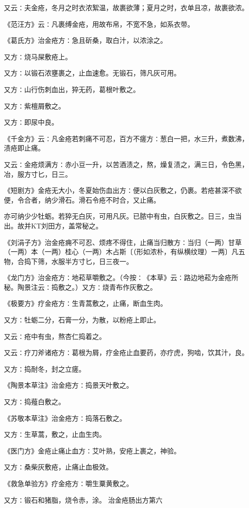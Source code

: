 \documentclass[a4paper,12pt,UTF8,twoside]{ctexbook}
\begin{document}
又云∶夫金疮，冬月之时衣浓絮温，故裹欲薄；夏月之时，衣单且凉，故裹欲浓。

《范汪方》云∶凡裹缚金疮，用故布帛，不宽不急，如系衣带。

《葛氏方》治金疮方∶急且斫桑，取白汁，以浓涂之。

又方∶烧马屎敷疮上。

又方∶以锻石浓壅裹之，止血速愈。无锻石，筛凡灰可用。

又方∶山行伤刺血出，猝无药，葛根叶敷之。

又方∶紫檀屑敷之。

又方∶即尿中良。

《千金方》云∶凡金疮若刺痛不可忍，百方不瘥方∶葱白一把，水三升，煮数沸，渍疮即止痛。

又云∶金疮烦满方∶赤小豆一升，以苦酒渍之，熬，燥复渍之，满三日，令色黑，冶，服方寸匕，日三。

《短剧方》金疮无大小，冬夏始伤血出方∶便以白灰敷之，仍裹。若疮甚深不欲便，令合者，纳少滑石。滑石令疮不时合，又止痛。

亦可纳少少牡蛎。若猝无白灰，可用凡灰。已脓中有虫，白灰敷之。日三，虫当出。故并KT刘田方，盖常秘之。

《刘涓子方》治金疮痈不可忍、烦疼不得住，止痛当归散方∶当归（一两）甘草（一两）本（一两）桂心（一两）木占斯〔（形如浓朴，有纵横纹理）一两〕凡五物，合捣下筛，水服半方寸匕，日三夜一。

《龙门方》治金疮方∶地菘草嚼敷之。（今按∶《本草》云∶路边地菘为金疮所秘。陶景注云∶捣敷之。）又方∶烧青布作灰敷之。

《极要方》疗金疮方∶生青蒿敷之，止痛，断血生肉。

又方∶牡蛎二分，石膏一分，为散，以粉疮上即止。

又云∶疮中有虫，熬杏仁捣着之。

又云∶疗刀斧诸疮方∶葛根为屑，疗金疮止血要药，亦疗虎，狗啮，饮其汁，良。

又方∶捣耐冬，封之立瘥。

《陶景本草注》治金疮方∶捣景天叶敷之。

又方∶捣薤白敷之。

《苏敬本草注》治金疮方∶捣落石敷之。

又方∶生草蒿，敷之，止血生肉。

《医门方》金疮止痛止血方∶艾叶熟，安疮上裹之，神验。

又方∶桑柴灰敷疮，止痛止血极效。

《救急单验方》疗金疮方∶嚼生粟黄敷之。

又方∶锻石和猪脂，烧令赤，涂。
治金疮肠出方第六
\end{document}

